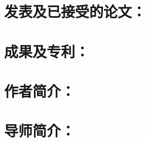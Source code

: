 \begin{achievements}
	
	\section*{发表及已接受的论文：}
	
	\begin{bibenumerate}
		\item
	\end{bibenumerate}

	\section*{成果及专利：}
	\begin{bibenumerate}
		\item 
	\end{bibenumerate}

\end{achievements}


\begin{resume}
	\section*{作者简介：} \zhlipsum[1]
	
	\section*{导师简介：} \zhlipsum[2]
\end{resume}
